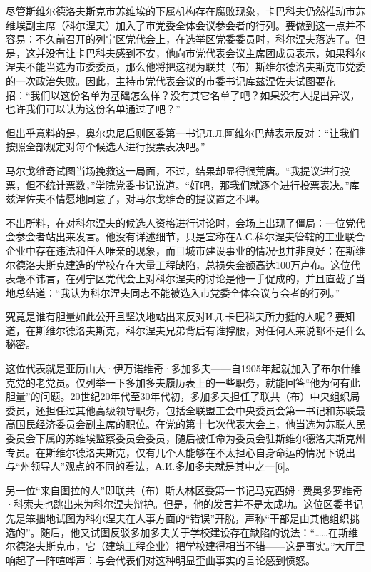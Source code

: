 尽管斯维尔德洛夫斯克市苏维埃的下属机构存在腐败现象，卡巴科夫仍然推动市苏维埃副主席（科尔涅夫）加入了市党委全体会议参会者的行列。要做到这一点并不容易：不久前召开的列宁区党代会上，在选举区党委委员时，科尔涅夫落选了。但是，这并没有让卡巴科夫感到不安，他向市党代表会议主席团成员表示，如果科尔涅夫不能当选为市委委员，那么他将把这视为联共（布）斯维尔德洛夫斯克市党委的一次政治失败。因此，主持市党代表会议的市委书记库兹涅佐夫试图耍花招：“我们以这份名单为基础怎么样？没有其它名单了吧？如果没有人提出异议，也许我们可以认为这份名单通过了吧？”

但出乎意料的是，奥尔忠尼启则区委第一书记Л.Л.阿维尔巴赫表示反对：“让我们按照全部规定对每个候选人进行投票表决吧。”

马尔戈维奇试图当场挽救这一局面，不过，结果却显得很荒唐。“我提议进行投票，但不统计票数，”学院党委书记说道。“好吧，那我们就逐个进行投票表决。”库兹涅佐夫不情愿地同意了，对马尔戈维奇的提议置之不理。

不出所料，在对科尔涅夫的候选人资格进行讨论时，会场上出现了僵局：一位党代会参会者站出来发言。他没有详述细节，只是宣称在А.С.科尔涅夫管辖的工业联合企业中存在违法和任人唯亲的现象，而且城市建设事业的情况也并非良好：在斯维尔德洛夫斯克建造的学校存在大量工程缺陷，总损失金额高达100万卢布。这位代表毫不讳言，在列宁区党代会上对科尔涅夫的讨论是他一手促成的，并且直截了当地总结道：“我认为科尔涅夫同志不能被选入市党委全体会议与会者的行列。”

究竟是谁有胆量如此公开且坚决地站出来反对И.Д.卡巴科夫所力挺的人呢？要知道，在斯维尔德洛夫斯克，科尔涅夫兄弟背后有谁撑腰，对任何人来说都不是什么秘密。

这位代表就是亚历山大·伊万诺维奇·多加多夫——自1905年起就加入了布尔什维克党的老党员。仅列举一下多加多夫履历表上的一些职务，就能回答“他为何有此胆量”的问题。20世纪20年代至30年代初，多加多夫担任了联共（布）中央组织局委员，还担任过其他高级领导职务，包括全联盟工会中央委员会第一书记和苏联最高国民经济委员会副主席的职位。在党的第十七次代表大会上，他当选为苏联人民委员会下属的苏维埃监察委员会委员，随后被任命为委员会驻斯维尔德洛夫斯克州专员。在斯维尔德洛夫斯克，仅有几个人能够在不太担心自身命运的情况下说出与“州领导人”观点的不同的看法，А.И.多加多夫就是其中之一[6]。

另一位“来自图拉的人”即联共（布）斯大林区委第一书记马克西姆·费奥多罗维奇·科索夫也跳出来为科尔涅夫辩护。但是，他的发言并不是太成功。这位区委书记先是笨拙地试图为科尔涅夫在人事方面的“错误”开脱，声称“干部是由其他组织挑选的”。随后，他又试图反驳多加多夫关于学校建设存在缺陷的说法：“……在斯维尔德洛夫斯克市，它（建筑工程企业）把学校建得相当不错——这是事实。”大厅里响起了一阵喧哗声：与会代表们对这种明显歪曲事实的言论感到愤怒。

